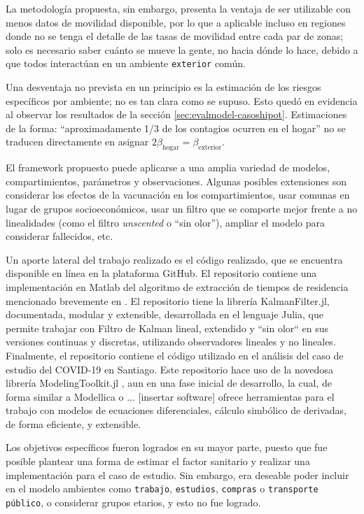 La metodología propuesta, sin embargo, presenta la ventaja de ser utilizable con menos datos de movilidad disponible, por lo que a aplicable incluso en regiones donde no se tenga el detalle de las tasas de movilidad entre cada par de zonas; solo es necesario saber cuánto se mueve la gente, no hacia dónde lo hace, debido a que todos interactúan en un ambiente \texttt{exterior} común.

Una desventaja no prevista en un principio es la estimación de los riesgos específicos por ambiente; no es tan clara como se supuso. Esto quedó en evidencia al observar los resultados de la sección \ref{sec:evalmodel-casoshipot}. Estimaciones de la forma: ``aproximadamente 1/3 de los contagios ocurren en el hogar'' \cite{Ferguson2020} no se traducen directamente en asignar \( 2 \beta_{\text{hogar}} = \beta_{\text{exterior}}\).


El framework propuesto puede aplicarse a una amplia variedad de modelos, compartimientos, parámetros y observaciones. Algunas posibles extensiones son considerar los efectos de la vacunación en los compartimientos, usar comunas en lugar de grupos socioeconómicos, usar un filtro que se comporte mejor frente a no linealidades (como el filtro \textit{unscented} o ``sin olor''), ampliar el modelo para considerar fallecidos, etc.

Un aporte lateral del trabajo realizado es el código realizado, que se encuentra disponible en línea en la plataforma GitHub. El repositorio \url{} contiene una implementación en Matlab del algoritmo de extracción de tiempos de residencia mencionado brevemente en \cite{Munizaga2011}. El repositorio \url{} tiene la librería KalmanFilter.jl, documentada, modular y extensible, desarrollada en el lenguaje Julia, que permite trabajar con Filtro de Kalman lineal, extendido y ``sin olor`` en sus versiones continuas y discretas, utilizando observadores lineales y no lineales. Finalmente, el repositorio \url{} contiene el código utilizado en el análisis del caso de estudio del COVID-19 en Santiago. Este repositorio hace uso de la novedosa librería ModelingToolkit.jl \cite{}, aun en una fase inicial de desarrollo, la cual, de forma similar a Modellica o ... [insertar software] ofrece herramientas para el trabajo con modelos de ecuaciones diferenciales, cálculo simbólico de derivadas, de forma eficiente, y extensible.


Los objetivos específicos fueron logrados en su mayor parte, puesto que fue posible plantear una forma de estimar el factor sanitario y realizar una implementación para el caso de estudio. Sin embargo, era deseable poder incluir en el modelo ambientes como \texttt{trabajo}, \texttt{estudios}, \texttt{compras} o \texttt{transporte público}, o considerar grupos etarios, y esto no fue logrado.